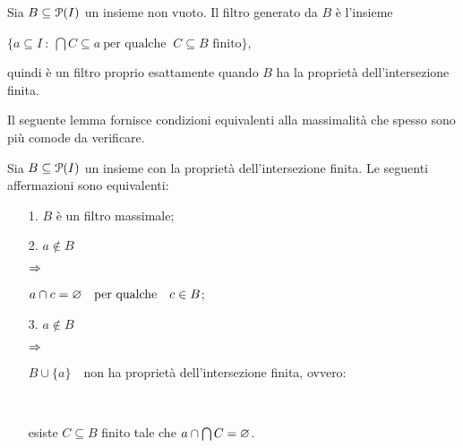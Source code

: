 \def\ceq#1#2#3{\hspace*{10ex}\llap{#1}\parbox{6ex}{\hfil#2}\rlap{#3}}

\begin{lemma} \label{proppif}
Sia $B\subseteq\P(I)$ un insieme non vuoto. Il filtro generato da $B$ \`e l'insieme

\hfil {$\Big\{a\subseteq I\ :\ \bigcap C\subseteq a\ \textrm{per qualche }\ C\subseteq B \textrm{ finito}\Big\}$,}

quindi \`e un filtro proprio esattamente quando $B$ ha la propriet\`a dell'intersezione finita.\QED
\end{lemma}

\def\ceq#1#2#3{\hspace*{25ex}\llap{#1}\parbox{6ex}{\hfil#2}\rlap{#3}}

Il seguente lemma fornisce condizioni equivalenti alla massimalit\`a che spesso sono pi\`u comode da verificare.

\begin{lemma}\label{lemmamassimale}
Sia $B\subseteq\P(I)$ un insieme con la propriet\`a dell'intersezione finita. Le seguenti affermazioni sono equivalenti:
\begin{itemize}
\item[1.] $B$ \`e un filtro massimale;
\item[2.] $a\notin B$\parbox{9ex}{\hfil $\IMP$}$a\cap  c = \0 \ \ \textrm{ per qualche }\ \ c\in B$;
\item[3.] $a\notin B$\parbox{9ex}{\hfil $\IMP$}$B\cup\{a\}$\ \  non ha propriet\`a dell'intersezione finita, ovvero:\\
\phantom{$a\notin B$}\parbox{9ex}{\ }esiste $C\subseteq B$ finito tale che $a\cap\bigcap C=\0$.
\end{itemize}
\end{lemma}


